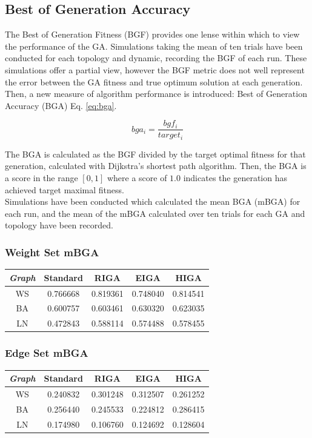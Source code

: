 \documentclass[
	a4paper, %
	10pt, %
	unnumberedsections, %
	twoside, %
]{LTJournalArticle}
\begin{document}
\subsection{Best of Generation Accuracy} 

The Best of Generation Fitness (BGF) provides one lense within which to view the performance of the GA.  Simulations taking the mean of ten trials have been conducted for each topology and dynamic, recording the BGF of each run. These simulations offer a partial view, however the BGF metric does not well represent the error between the GA fitness and true optimum solution at each generation. Then, a new measure of algorithm performance is introduced: Best of Generation Accuracy (BGA) Eq. \ref{eq:bga}. 

\begin{equation}
	bga_{i} = \frac{bgf_{i}}{target_{i}}
	\label{eq:bga}
\end{equation}

The BGA is calculated as the BGF divided by the target optimal fitness for that generation, calculated with Dijkstra's shortest path algorithm. Then, the BGA is a score in the range \([0, 1]\) where a score of \(1.0\) indicates the generation has achieved target maximal fitness. \\

Simulations have been conducted which calculated the mean BGA (mBGA) for each run, and the mean of the mBGA calculated over ten trials for each GA and topology have been recorded. \\

\subsubsection{Weight Set mBGA} 
\begin{center}
\begin{tabular}{||c c c c c||} 
 \hline
 \emph{Graph} & Standard & RIGA & EIGA & HIGA \\ [0.5ex] 
 \hline\hline
 WS & 0.766668 & 0.819361 & 0.748040 & 0.814541 \\ 
 \hline
 BA & 0.600757 & 0.603461 & 0.630320 & 0.623035 \\
 \hline
 LN & 0.472843 & 0.588114 & 0.574488 & 0.578455 \\
\end{tabular}
\end{center}

\subsubsection{Edge Set mBGA} 
\begin{center}
\begin{tabular}{||c c c c c||} 
 \hline
 \emph{Graph} & Standard & RIGA & EIGA & HIGA \\ [0.5ex] 
 \hline\hline
 WS & 0.240832 & 0.301248 & 0.312507 & 0.261252 \\ 
 \hline
 BA & 0.256440 & 0.245533 & 0.224812 & 0.286415\\
 \hline
 LN & 0.174980 & 0.106760 & 0.124692 & 0.128604  \\
\end{tabular}
\end{center}
\end{document}
